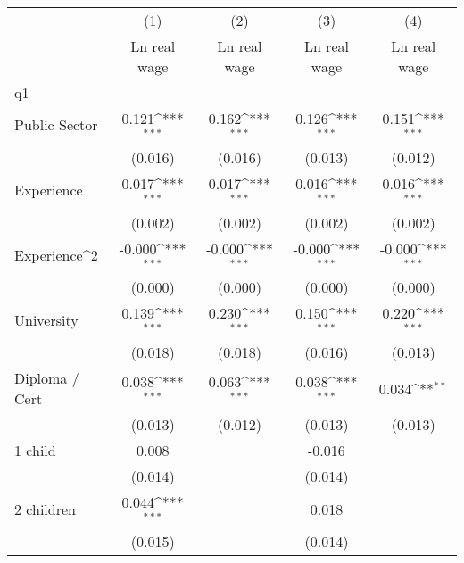 {
\def\sym#1{\ifmmode^{#1}\else\(^{#1}\)\fi}
\begin{tabular}{l*{4}{c}}
\hline\hline
                    &\multicolumn{1}{c}{(1)}&\multicolumn{1}{c}{(2)}&\multicolumn{1}{c}{(3)}&\multicolumn{1}{c}{(4)}\\
                    &\multicolumn{1}{c}{Ln real wage}&\multicolumn{1}{c}{Ln real wage}&\multicolumn{1}{c}{Ln real wage}&\multicolumn{1}{c}{Ln real wage}\\
\hline
q1                  &                     &                     &                     &                     \\
Public Sector       &       0.121\sym{***}&       0.162\sym{***}&       0.126\sym{***}&       0.151\sym{***}\\
                    &     (0.016)         &     (0.016)         &     (0.013)         &     (0.012)         \\
Experience          &       0.017\sym{***}&       0.017\sym{***}&       0.016\sym{***}&       0.016\sym{***}\\
                    &     (0.002)         &     (0.002)         &     (0.002)         &     (0.002)         \\
Experience^{2}      &      -0.000\sym{***}&      -0.000\sym{***}&      -0.000\sym{***}&      -0.000\sym{***}\\
                    &     (0.000)         &     (0.000)         &     (0.000)         &     (0.000)         \\
University          &       0.139\sym{***}&       0.230\sym{***}&       0.150\sym{***}&       0.220\sym{***}\\
                    &     (0.018)         &     (0.018)         &     (0.016)         &     (0.013)         \\
Diploma / Cert      &       0.038\sym{***}&       0.063\sym{***}&       0.038\sym{***}&       0.034\sym{**} \\
                    &     (0.013)         &     (0.012)         &     (0.013)         &     (0.013)         \\
1 child             &       0.008         &                     &      -0.016         &                     \\
                    &     (0.014)         &                     &     (0.014)         &                     \\
2 children          &       0.044\sym{***}&                     &       0.018         &                     \\
                    &     (0.015)         &                     &     (0.014)         &                     \\

\end{tabular}}
